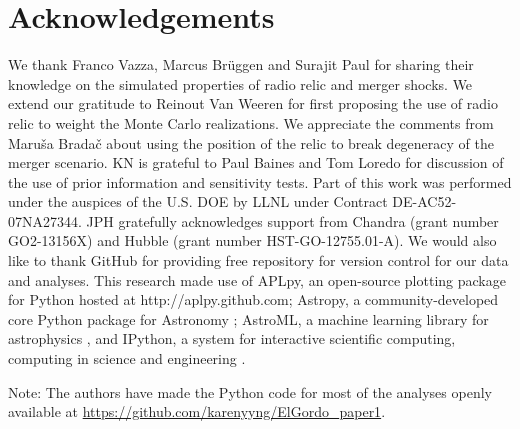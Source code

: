 \documentclass[ucdthesis.tex]{subfiles}
\begin{document}
    \section{Acknowledgements}
    We thank Franco Vazza, Marcus Br\"{u}ggen and Surajit Paul for sharing
    their knowledge on the simulated properties of radio relic and merger
    shocks. We extend our gratitude to Reinout Van Weeren for first proposing the use of
    radio relic to weight the Monte Carlo realizations. We appreciate the
    comments from Maru\v{s}a Brada\v{c} about using the position of the relic to
    break degeneracy of the merger scenario. KN is grateful to Paul Baines and
    Tom Loredo for discussion of the use of prior information and sensitivity tests. 
    Part of this work was performed under the auspices of the U.S. DOE by LLNL
    under Contract DE-AC52-07NA27344. 
    JPH gratefully acknowledges support from Chandra (grant number GO2-13156X)
    and Hubble (grant number HST-GO-12755.01-A).
    We would also like to thank 
    GitHub for providing free repository for version control for our data and
    analyses. This research made use of APLpy, an open-source plotting package for Python
    hosted at http://aplpy.github.com; Astropy, a community-developed core
    Python package for Astronomy \citep{astropy}; AstroML, a
    machine learning library for astrophysics \citep{VanderPlas2012}, and IPython, a system for
    interactive scientific computing, computing in science and engineering
    \citep{Perez2007}.\par
    Note: The authors have made the Python code for most of the analyses openly
    available at
    \href{https://github.com/karenyyng/ElGordo\_paper1}{https://github.com/karenyyng/ElGordo\_paper1}. 
    \bsp 

      
\end{document}
